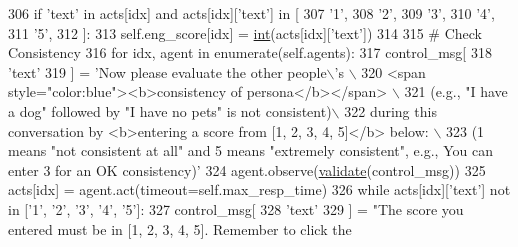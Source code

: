 \begin{DoxyCode}
306                         \textcolor{keywordflow}{if} \textcolor{stringliteral}{'text'} \textcolor{keywordflow}{in} acts[idx] \textcolor{keywordflow}{and} acts[idx][\textcolor{stringliteral}{'text'}] \textcolor{keywordflow}{in} [
307                             \textcolor{stringliteral}{'1'},
308                             \textcolor{stringliteral}{'2'},
309                             \textcolor{stringliteral}{'3'},
310                             \textcolor{stringliteral}{'4'},
311                             \textcolor{stringliteral}{'5'},
312                         ]:
313                             self.eng\_score[idx] = \hyperlink{namespacelanguage__model_1_1eval__ppl_a7d12ee00479673c5c8d1f6d01faa272a}{int}(acts[idx][\textcolor{stringliteral}{'text'}])
314 
315                     \textcolor{comment}{# Check Consistency}
316                     \textcolor{keywordflow}{for} idx, agent \textcolor{keywordflow}{in} enumerate(self.agents):
317                         control\_msg[
318                             \textcolor{stringliteral}{'text'}
319                         ] = \textcolor{stringliteral}{'Now please evaluate the other people\(\backslash\)'s \(\backslash\)}
320 \textcolor{stringliteral}{                                              <span style="color:blue"><b>consistency of persona</b></span>
       \(\backslash\)}
321 \textcolor{stringliteral}{                                              (e.g., "I have a dog" followed by "I have no pets" is not
       consistent)\(\backslash\)}
322 \textcolor{stringliteral}{                                              during this conversation by <b>entering a score from [1, 2,
       3, 4, 5]</b> below: \(\backslash\)}
323 \textcolor{stringliteral}{                                               (1 means "not consistent at all" and 5 means "extremely
       consistent", e.g., You can enter 3 for an OK consistency)'}
324                         agent.observe(\hyperlink{namespaceparlai_1_1core_1_1worlds_afc3fad603b7bce41dbdc9cdc04a9c794}{validate}(control\_msg))
325                         acts[idx] = agent.act(timeout=self.max\_resp\_time)
326                         \textcolor{keywordflow}{while} acts[idx][\textcolor{stringliteral}{'text'}] \textcolor{keywordflow}{not} \textcolor{keywordflow}{in} [\textcolor{stringliteral}{'1'}, \textcolor{stringliteral}{'2'}, \textcolor{stringliteral}{'3'}, \textcolor{stringliteral}{'4'}, \textcolor{stringliteral}{'5'}]:
327                             control\_msg[
328                                 \textcolor{stringliteral}{'text'}
329                             ] = \textcolor{stringliteral}{"The score you entered must be in [1, 2, 3, 4, 5]. Remember to click the
}
\end{DoxyCode}
